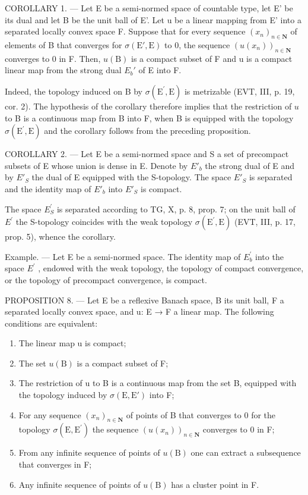 COROLLARY 1. --- Let E be a semi-normed space of countable type, let E' be its dual and let B be the unit ball of E'. Let u be a linear mapping from E' into a separated locally convex space F. Suppose that for every sequence \((x_{n})_{n\in\mathbf{N}}\) of elements of B that converges for \(\sigma(\mathrm{E}',\mathrm{E})\) to 0, the sequence \((u(x_{n}))_{n\in\mathbf{N}}\) converges to 0 in F. Then, \(u(\mathrm{B})\) is a compact subset of F and u is a compact linear map from the strong dual \(E_{b}'\) of E into F.

Indeed, the topology induced on B by \(\sigma(\mathrm{E}^{\prime},\mathrm{E})\) is metrizable (EVT, III, p. 19, cor. 2). The hypothesis of the corollary therefore implies that the restriction of \(u\) to B is a continuous map from B into F, when B is equipped with the topology \(\sigma(\mathrm{E}^{\prime},\mathrm{E})\) and the corollary follows from the preceding proposition.

COROLLARY 2. --- Let E be a semi-normed space and S a set of precompact subsets of E whose union is dense in E. Denote by \(E'_{b}\) the strong dual of E and by \(E'_{S}\) the dual of E equipped with the S-topology. The space \(E'_{S}\) is separated and the identity map of \(E'_{b}\) into \(E'_{S}\) is compact.

The space \(E_{S}^{\prime}\) is separated according to TG, X, p. 8, prop. 7; on the unit ball of \(E^{\prime}\) the S-topology coincides with the weak topology \(\sigma(\mathrm{E}^{\prime},\mathrm{E})\) (EVT, III, p. 17, prop. 5), whence the corollary.

Example. --- Let E be a semi-normed space. The identity map of \(E_{b}^{\prime}\) into the space \(E^{\prime}\) , endowed with the weak topology, the topology of compact convergence, or the topology of precompact convergence, is compact.

PROPOSITION 8. --- Let E be a reflexive Banach space, B its unit ball, F a separated locally convex space, and u: E → F a linear map. The following conditions are equivalent:

\begin{enumerate}
\def\labelenumi{(\roman{enumi})}
\item
  The linear map u is compact;
\item
  The set \(u(\mathrm{B})\) is a compact subset of F;
\item
  The restriction of u to B is a continuous map from the set B, equipped with the topology induced by \(\sigma(\mathrm{E},\mathrm{E}')\) into F;
\item
  For any sequence \((x_{n})_{n\in \mathbf{N}}\) of points of B that converges to 0 for the topology \(\sigma (\mathrm{E},\mathrm{E}^{\prime})\) the sequence \((u(x_n))_{n\in \mathbf{N}}\) converges to 0 in F;
\item
  From any infinite sequence of points of \(u(\mathrm{B})\) one can extract a subsequence that converges in F;
\item
  Any infinite sequence of points of \(u(\mathrm{B})\) has a cluster point in F.
\end{enumerate}

